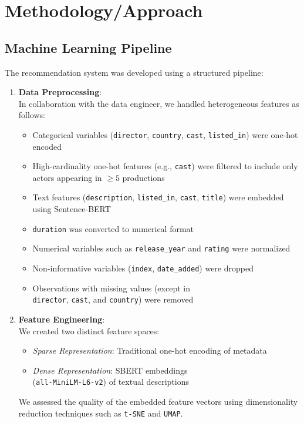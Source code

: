 \documentclass{article}
\begin{document}
\section*{Methodology/Approach}

\subsection*{Machine Learning Pipeline} 
The recommendation system was developed using a structured pipeline:

\begin{enumerate}
    \item \textbf{Data Preprocessing}: \\
        In collaboration with the data engineer, we handled heterogeneous features as follows:
        \begin{itemize}
            \item Categorical variables (\verb|director|, \verb|country|, \verb|cast|, \verb|listed_in|) were one-hot encoded
            \item High-cardinality one-hot features (e.g., \verb|cast|) were filtered to include only actors appearing in $\geq 5$ productions
            \item Text features (\verb|description|, \verb|listed_in|, \verb|cast|, \verb|title|) were embedded using Sentence-BERT
            \item \verb|duration| was converted to numerical format
            \item Numerical variables such as \verb|release_year| and \verb|rating| were normalized
            \item Non-informative variables (\verb|index|, \verb|date_added|) were dropped
            \item Observations with missing values (except in \\
            \verb|director|, \verb|cast|, and \verb|country|) were removed
    \end{itemize}


    \item \textbf{Feature Engineering}: \\
        We created two distinct feature spaces:
        \begin{itemize}
            \item \textit{Sparse Representation}: Traditional one-hot encoding of metadata
            \item \textit{Dense Representation}: SBERT embeddings \\ (\verb|all-MiniLM-L6-v2|) of textual descriptions
        \end{itemize}
        We assessed the quality of the embedded feature vectors using dimensionality reduction techniques such as \verb|t-SNE| and \verb|UMAP|.



\end{enumerate}
\end{document}
